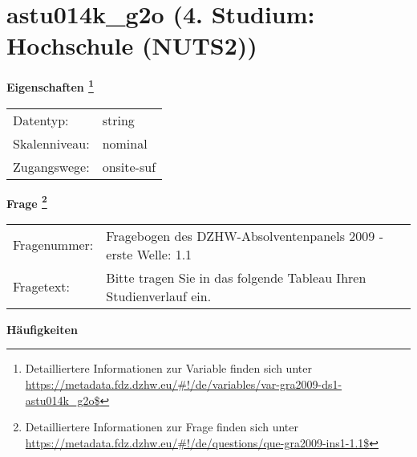 
    \setcounter{footnote}{0}

    \vspace*{-1.8cm}
	\section{astu014k\_g2o (4. Studium: Hochschule (NUTS2))}
	\label{section:astu014k_g2o}



    \vspace*{0.5cm}
    \noindent\textbf{Eigenschaften
	\footnote{Detailliertere Informationen zur Variable finden sich unter
		\url{https://metadata.fdz.dzhw.eu/\#!/de/variables/var-gra2009-ds1-astu014k_g2o$}}}\\
	\begin{tabularx}{\hsize}{@{}lX}
	Datentyp: & string \\
	Skalenniveau: & nominal \\
	Zugangswege: &
	  onsite-suf
 \\
    \end{tabularx}



				\vspace*{0.5cm}
                \noindent\textbf{Frage
	                \footnote{Detailliertere Informationen zur Frage finden sich unter
		              \url{https://metadata.fdz.dzhw.eu/\#!/de/questions/que-gra2009-ins1-1.1$}}}\\
				\begin{tabularx}{\hsize}{@{}lX}
					Fragenummer: &
					  Fragebogen des DZHW-Absolventenpanels 2009 - erste Welle:
					  1.1
 \\
					Fragetext: & Bitte tragen Sie in das folgende Tableau Ihren Studienverlauf ein. \\
				\end{tabularx}





        		\vspace*{0.5cm}
                \noindent\textbf{Häufigkeiten}


